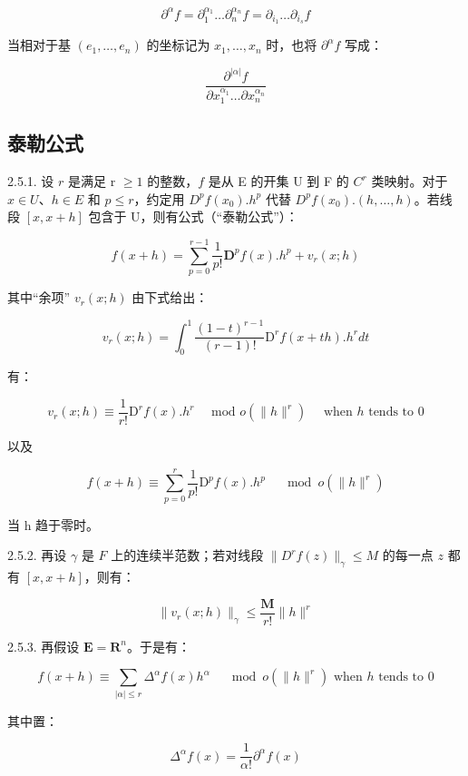 \[
\partial^ {\alpha} f = \partial_ {1} ^ {\alpha_ {1}} \dots \partial_ {n} ^ {\alpha_ {n}} f = \partial_ {i _ {1}} \dots \partial_ {i _ {s}} f
\]

当相对于基 \((e_{1},\ldots,e_{n})\) 的坐标记为 \(x_{1},\ldots,x_{n}\) 时，也将 \(\partial^{\alpha}f\) 写成：

\[
\frac {\partial^ {| \alpha |} f}{\partial x _ {1} ^ {\alpha_ {1}} \dots \partial x _ {n} ^ {\alpha_ {n}}}
\]

\subsection{泰勒公式}

2.5.1. 设 \(r\) 是满足 r \(\geqslant 1\) 的整数，\(f\) 是从 E 的开集 U 到 F 的 \(C^r\) 类映射。对于 \(x \in U\)、\(h \in E\) 和 \(p \leqslant r\)，约定用 \(D^{p}f(x_0).h^p\) 代替 \(D^{p}f(x_0).(h,\ldots,h)\)。若线段 \([x,x + h]\) 包含于 U，则有公式（“泰勒公式”）：

\[
f (x + h) = \sum_ {p = 0} ^ {r - 1} \frac {1}{p !} \mathbf {D} ^ {p} f (x). h ^ {p} + v _ {r} (x; h)
\]

其中“余项” \(v_{r}(x; h)\) 由下式给出：

\[
v _ {r} (x; h) = \int_ {0} ^ {1} \frac {(1 - t) ^ {r - 1}}{(r - 1) !} \mathrm{D} ^ {r} f (x + t h). h ^ {r} d t
\]

有：

\[
v _ {r} (x; h) \equiv \frac {1}{r !} \mathrm{D} ^ {r} f (x). h ^ {r} \quad \text {   mod   } o (\| h \| ^ {r}) \quad \text {   when   } h \text {   tends   to   } 0
\]

以及

\[
f (x + h) \equiv \sum_ {p = 0} ^ {r} \frac {1}{p !} \mathrm{D} ^ {p} f (x). h ^ {p} \quad \mod o (\| h \| ^ {r})
\]

当 h 趋于零时。

2.5.2. 再设 \(\gamma\) 是 \(F\) 上的连续半范数；若对线段 \(\|D^{r}f(z)\|_{\gamma}\leqslant M\) 的每一点 \(z\) 都有 \([x,x + h]\)，则有：

\[
\| v _ {r} (x; h) \| _ {\gamma} \leqslant \frac {\mathbf {M}}{r !} \| h \| ^ {r}
\]

2.5.3. 再假设 \(\mathbf{E} = \mathbf{R}^n\)。于是有：

\[
f (x + h) \equiv \sum_ {| \alpha | \leqslant r} \Delta^ {\alpha} f (x) h ^ {\alpha} \quad \mod o (\| h \| ^ {r}) \text {   when   } h \text {   tends   to   } 0
\]

其中置：

\[
\Delta^ {\alpha} f (x) = \frac {1}{\alpha !} \partial^ {\alpha} f (x)
\]

